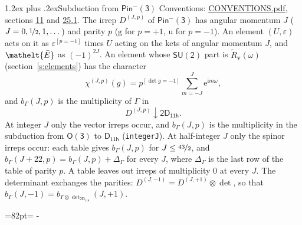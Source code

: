 \documentclass[10pt,a4paper]{article}
\makeatletter
\renewcommand\section{\@startsection{section}{1}{\z@}{-3ex plus -1ex minus -.2ex}%
  {1.2ex plus .2ex}{\normalfont\large\sffamily\bfseries\color{parttitle}}}
\newcommand{\needspace}[1]{\par\penalty-100\begingroup\dimen0=#1\relax\dimen2=\pagegoal
  \advance\dimen2-\pagetotal\ifdim\dimen0>\dimen2\relax\ifdim\dimen2>0pt\vfil\break\fi\fi
  \endgroup}
\numberwithin{equation}{section}
\newcommand{\eltfont}[1]{{\let\sigma\eltsigma\mathelt{#1}}}
\newcommand{\grp}[1]{\mathsf{#1}}
\newcommand{\elt}[1]{\eltfont{#1}}
\newcommand{\ptag}[1]{\mathrm{#1}}
\newcommand{\iverson}[1]{[#1]}
\newcommand{\restr}[2]{#1\!\downarrow#2}
\newcommand{\vv}{\mathbf{v}}
\newcommand{\iunit}{\mathrm{i}}
\newcommand{\expe}{\mathrm{e}}
\newcommand{\irrJp}[2]{D^{(#1,#2)}}
\newcommand{\irrprod}{\otimes}
\newcommand{\barred}[1]{\bar{#1}}
\newcommand{\lift}[1]{\tilde{#1}}
\makeatother
\begin{document}
\section{Subduction from \texorpdfstring{$\grp{Pin^{-}(3)}$}{Pin(3)}}\label{s:subduction_parent}
Conventions: \href{../../CONVENTIONS.pdf}{CONVENTIONS.pdf}, sections \href{../../../rotation/CONVENTIONS.pdf\#conv.11}{11} and \href{../../CONVENTIONS.pdf\#conv.25.1}{25.1}.
\leavevmode\label{n:index.J}\label{n:index.parity}\label{n:irrep.o3}The irrep $\irrJp{J}{p}$ of \href{Pinminus3.pdf}{$\grp{Pin^{-}(3)}$} has angular momentum $J$ ($J = 0, \nicefrac{1}{2}, 1, \dots$) and parity $p$ ($\ptag{g}$ for $p = +1$, $\ptag{u}$ for $p = -1$). An element $(U, \varepsilon)$ acts on it as $\varepsilon^{[p = -1]}$ times $U$ acting on the kets of angular momentum $J$, and $\elt{\barred{E}}$ as $(-1)^{2J}$. \label{n:function.character.parent}\label{n:function.multiplicity}An element whose $\grp{SU(2)}$ part is $\lift{R}_{\vv}(\omega)$ (section~\ref{s:elements}) has the character
\begin{equation}\label{e:chi}\chi^{(J,p)}(g) = p^{\iverson{\det g = -1}}\sum_{m=-J}^{J} \expe^{\iunit m\omega},\end{equation}
and $b_\Gamma(J, p)$ is the multiplicity of $\Gamma$ in
\begin{equation}\label{e:parent}\restr{\irrJp{J}{p}}{\grp{2D_{11h}}}.\end{equation}
At integer $J$ only the vector irreps occur, and $b_\Gamma(J, p)$ is the multiplicity in the subduction from $\grp{O(3)}$ to \href{../../../rotation/data/pdf/D11h.pdf}{$\grp{D_{11h}}$} (\texttt{integerJ}). \label{n:index.increment}At half-integer $J$ only the spinor irreps occur: each table gives $b_\Gamma(J, p)$ for $J \le \nicefrac{43}{2}$, and $b_\Gamma(J + 22, p) = b_\Gamma(J, p) + \Delta_\Gamma$ for every $J$, where $\Delta_\Gamma$ is the last row of the table of parity $p$. A table leaves out irreps of multiplicity 0 at every $J$.
\leavevmode\label{n:operator.determinant.character}The determinant exchanges the parities: $\irrJp{J}{-1} = \irrJp{J}{+1} \irrprod \det$, so that $b_\Gamma(J, -1) = b_{\Gamma \irrprod \det_{\grp{2D_{11h}}}}(J, +1)$.
\needspace{82pt}
\end{document}

